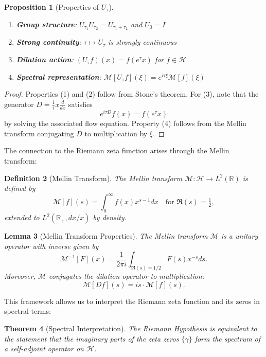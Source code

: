 \documentclass[11pt,hyp,]{nyjm}
\newtheorem{theorem}{Theorem}
\newtheorem{lemma}[theorem]{Lemma}
\newtheorem{proposition}[theorem]{Proposition}
\newtheorem{definition}[theorem]{Definition}
\begin{document}
\begin{proposition}[Properties of $U_\tau$]\label{prop:U-properties}
\begin{enumerate}
\item \textbf{Group structure}: $U_{\tau_1}U_{\tau_2} = U_{\tau_1+\tau_2}$ and $U_0 = I$
\item \textbf{Strong continuity}: $\tau \mapsto U_\tau$ is strongly continuous
\item \textbf{Dilation action}: $(U_\tau f)(x) = f(e^\tau x)$ for $f \in \mathcal{H}$
\item \textbf{Spectral representation}: $\mathcal{M}[U_\tau f](\xi) = e^{i\tau\xi}\mathcal{M}[f](\xi)$
\end{enumerate}
\end{proposition}

\begin{proof}
Properties (1) and (2) follow from Stone's theorem. For (3), note that the generator $D = \tfrac{1}{i}x\frac{d}{dx}$ satisfies
\[
e^{i\tau D}f(x) = f(e^\tau x)
\]
by solving the associated flow equation. Property (4) follows from the Mellin transform conjugating $D$ to multiplication by $\xi$.
\end{proof}

The connection to the Riemann zeta function arises through the Mellin transform:

\begin{definition}[Mellin Transform]
The Mellin transform $\mathcal{M}: \mathcal{H} \to L^2(\mathbb{R})$ is defined by
\[
\mathcal{M}[f](s) = \int_0^\infty f(x) x^{s-1} dx \quad \text{for } \Re(s) = \tfrac12,
\]
extended to $L^2(\mathbb{R}_+, dx/x)$ by density.
\end{definition}

\begin{lemma}[Mellin Transform Properties]\label{lem:Mellin-properties}
The Mellin transform $\mathcal{M}$ is a unitary operator with inverse given by
\[
\mathcal{M}^{-1}[F](x) = \frac{1}{2\pi i} \int_{\Re(s)=1/2} F(s) x^{-s} ds.
\]
Moreover, $\mathcal{M}$ conjugates the dilation operator to multiplication:
\[
\mathcal{M}[Df](s) = is \cdot \mathcal{M}[f](s).
\]
\end{lemma}

This framework allows us to interpret the Riemann zeta function and its zeros in spectral terms:

\begin{theorem}[Spectral Interpretation]\label{thm:spectral-interp}
The Riemann Hypothesis is equivalent to the statement that the imaginary parts of the zeta zeros $\{\gamma\}$ form the spectrum of a self-adjoint operator on $\mathcal{H}$.
\end{theorem}
\end{document}
